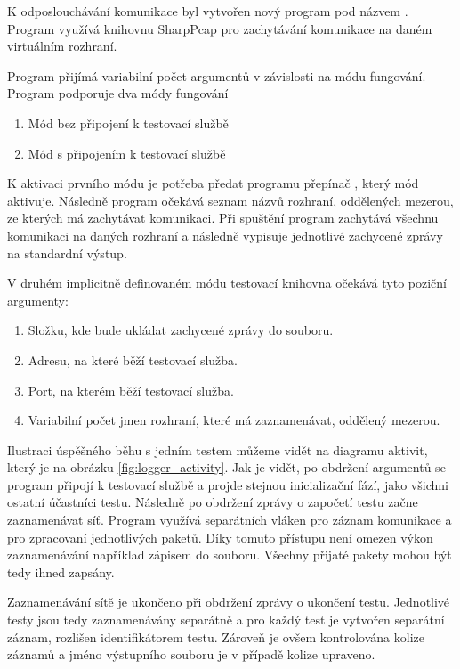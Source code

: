 K odposlouchávání komunikace byl vytvořen nový program pod názvem . Program využívá knihovnu SharpPcap\cite{sharppcap} pro zachytávání komunikace na daném virtuálním rozhraní. 

Program přijímá variabilní počet argumentů v závislosti na módu fungování. Program podporuje dva módy fungování

\begin{enumerate}
    \item Mód bez připojení k testovací službě
    \item Mód s připojením k testovací službě
\end{enumerate}

K aktivaci prvního módu je potřeba předat programu přepínač , který mód aktivuje. Následně program očekává seznam názvů rozhraní, oddělených mezerou, ze kterých má zachytávat komunikaci. Při spuštění program zachytává všechnu komunikaci na daných rozhraní a následně vypisuje jednotlivé zachycené zprávy na standardní výstup.

V druhém implicitně definovaném módu testovací knihovna očekává tyto poziční argumenty:

\begin{enumerate}
    \item Složku, kde bude ukládat zachycené zprávy do souboru.
    \item Adresu, na které běží testovací služba.
    \item Port, na kterém běží testovací služba.
    \item Variabilní počet jmen rozhraní, které má zaznamenávat, oddělený mezerou.
\end{enumerate}

Ilustraci úspěšného běhu s jedním testem můžeme vidět na diagramu aktivit, který je na obrázku \ref{fig:logger_activity}. Jak je vidět, po obdržení argumentů se program připojí k testovací službě a projde stejnou inicializační fází, jako všichni ostatní účastníci testu. Následně po obdržení zprávy o započetí testu začne zaznamenávat síť. Program využívá separátních vláken pro záznam komunikace a pro zpracovaní jednotlivých paketů. Díky tomuto přístupu není omezen výkon zaznamenávání například zápisem do souboru. Všechny přijaté pakety mohou být tedy ihned zapsány. 

Zaznamenávání sítě je ukončeno při obdržení zprávy o ukončení testu. Jednotlivé testy jsou tedy zaznamenávány separátně a pro každý test je vytvořen separátní záznam, rozlišen identifikátorem testu. Zároveň je ovšem kontrolována kolize záznamů a jméno výstupního souboru je v případě kolize upraveno. 

